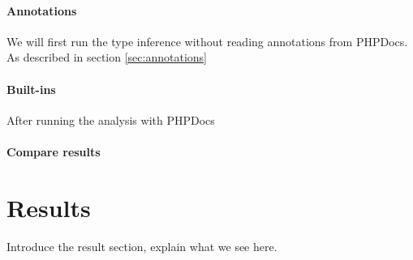\documentclass[../main.tex]{subfiles}
\begin{document}
	\paragraph{Annotations}
	We will first run the type inference without reading annotations from PHPDocs.
	As described in section \ref{sec:annotations}
	
	\paragraph{Built-ins}
	After running the analysis with PHPDocs
	
	\paragraph{Compare results}
	
		
	\section{Results}\label{sec:evaluation_results}
	
	Introduce the result section, explain what we see here.
\end{document}
